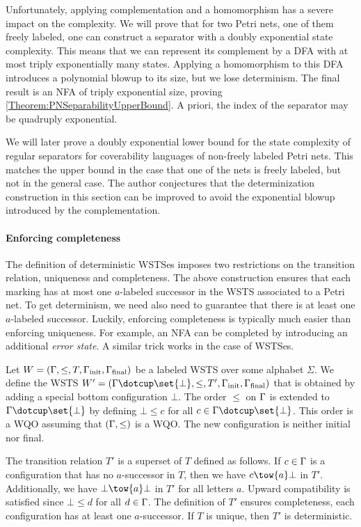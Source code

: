 \documentclass[../../diss.tex]{subfiles}
\begin{document}
Unfortunately, applying complementation and a homomorphism has a severe impact on the complexity.
We will prove that for two Petri nets, one of them freely labeled, one can construct a separator with a doubly exponential state complexity.
This means that we can represent its complement by a DFA with at most triply exponentially many states.
Applying a homomorphism to this DFA introduces a polynomial blowup to its size, but we lose determinism.
The final result is an NFA of triply exponential size, proving \cref{Theorem:PNSeparabilityUpperBound}.
A priori, the index of the separator may be quadruply exponential.

We will later prove a doubly exponential lower bound for the state complexity of regular separators for coverability languages of non-freely labeled Petri nets.
This matches the upper bound in the case that one of the nets is freely labeled, but not in the general case.
The author conjectures that the determinization construction in this section can be improved to avoid the exponential blowup introduced by the complementation.

\paragraph{Enforcing completeness}

The definition of deterministic WSTSes imposes two restrictions on the transition relation, uniqueness and completeness.
The above construction ensures that each marking has at most one $a$-labeled successor in the WSTS associated to a Petri net.
To get determinism, we need also need to guarantee that there is at least one $a$-labeled successor.
Luckily, enforcing completeness is typically much easier than enforcing uniqueness.
For example, an NFA can be completed by introducing an additional \emph{error state}.
A similar trick works in the case of WSTSes.

Let $W = (\Gamma,\leq,T,\Gamma_{\text{init}}, \Gamma_{\text{final}})$ be a labeled WSTS over some alphabet $\Sigma$.
We define the WSTS $\wstsprime = (\configs \dotcup \set{\bot},\leq,T',\configs_\init,\configs_\final)$ that is obtained by adding a special bottom configuration $\bot$.
The order $\leq$ on $\Gamma$ is extended to $\configs \dotcup \set{\bot}$ by defining $\bot \leq c$ for all $c \in \configs \dotcup \set{\bot}$.
This order is a WQO assuming that $(\Gamma,\leq)$ is a WQO.\@
The new configuration is neither initial nor final.

The transition relation $T'$ is a superset of $T$ defined as follows.
If $c \in \Gamma$ is a configuration that has no $a$-successor in $T$, then we have $c \tow{a} \bot$ in $T'$.
Additionally, we have $\bot \tow{a} \bot$ in $T'$ for all letters $a$.
Upward compatibility is satisfied since $\bot \leq d$ for all $d \in \Gamma$.
The definition of $T'$ ensures completeness, \ie each configuration has at least one $a$-successor.
If $T$ is unique, then $T'$ is deterministic.
\end{document}
